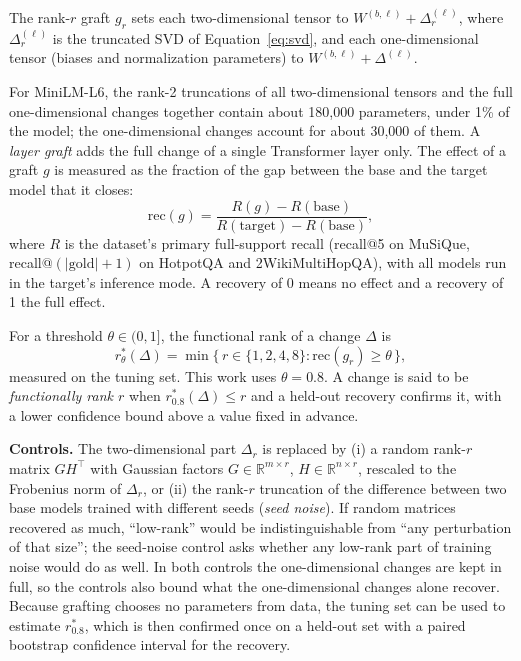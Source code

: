 \begin{definition}
The rank-$r$ graft $g_r$ sets each two-dimensional tensor to $W^{(b,\ell)}+\Delta^{(\ell)}_r$, where $\Delta^{(\ell)}_r$ is the truncated SVD of Equation~\ref{eq:svd}, and each one-dimensional tensor (biases and normalization parameters) to $W^{(b,\ell)}+\Delta^{(\ell)}$.
\end{definition}

For MiniLM-L6, the rank-2 truncations of all two-dimensional tensors and the full one-dimensional changes together contain about 180,000 parameters, under 1\% of the model; the one-dimensional changes account for about 30,000 of them. A \emph{layer graft} adds the full change of a single Transformer layer only. The effect of a graft $g$ is measured as the fraction of the gap between the base and the target model that it closes:
\begin{equation}
\mathrm{rec}(g) = \frac{R(g) - R(\text{base})}{R(\text{target}) - R(\text{base})},
\label{eq:recovery}
\end{equation}
where $R$ is the dataset's primary full-support recall (recall@5 on MuSiQue, recall@$(|\text{gold}|+1)$ on HotpotQA and 2WikiMultiHopQA), with all models run in the target's inference mode. A recovery of 0 means no effect and a recovery of 1 the full effect.

\begin{definition}
\label{def:functional_rank}
For a threshold $\theta\in(0,1]$, the functional rank of a change $\Delta$ is
\[
r^*_\theta(\Delta)=\min\{\,r\in\{1,2,4,8\}:\mathrm{rec}(g_r)\ge\theta\,\},
\]
measured on the tuning set. This work uses $\theta=0.8$. A change is said to be \emph{functionally rank $r$} when $r^*_{0.8}(\Delta)\le r$ and a held-out recovery confirms it, with a lower confidence bound above a value fixed in advance.
\end{definition}

\textbf{Controls.} The two-dimensional part $\Delta_r$ is replaced by (i) a random rank-$r$ matrix $GH^\top$ with Gaussian factors $G\in\mathbb{R}^{m\times r}$, $H\in\mathbb{R}^{n\times r}$, rescaled to the Frobenius norm of $\Delta_r$, or (ii) the rank-$r$ truncation of the difference between two base models trained with different seeds (\emph{seed noise}). If random matrices recovered as much, ``low-rank'' would be indistinguishable from ``any perturbation of that size''; the seed-noise control asks whether any low-rank part of training noise would do as well. In both controls the one-dimensional changes are kept in full, so the controls also bound what the one-dimensional changes alone recover. Because grafting chooses no parameters from data, the tuning set can be used to estimate $r^*_{0.8}$, which is then confirmed once on a held-out set with a paired bootstrap confidence interval for the recovery.

